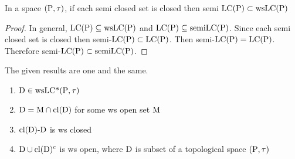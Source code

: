 \begin{thm}\label{thm6.2.24}
In a space $(\mathrm{P}, \tau)$, if each semi closed set is closed then semi $\mathrm{LC}(\mathrm{P}) \subset \mathrm{ws}\mathrm{LC}(\mathrm{P})$
\end{thm}

\begin{proof}
In general, $\mathrm{LC}(\mathrm{P}) \subseteq \mathrm{ws}\mathrm{LC}(\mathrm{P})$ and $\mathrm{LC}(\mathrm{P}) \subseteq \mathrm{semi}\mathrm{LC}(\mathrm{P})$. Since each semi closed set is closed then semi-$\mathrm{LC}(\mathrm{P}) \subset \mathrm{LC}(\mathrm{P})$. Then semi-$\mathrm{LC}(\mathrm{P}) = \mathrm{LC}(\mathrm{P})$. Therefore semi-$\mathrm{LC}(\mathrm{P}) \subset \mathrm{semi}\mathrm{LC}(\mathrm{P})$.
\end{proof}

\begin{thm}\label{thm6.2.25}
The given results are one and the same.
\begin{enumerate}[(1)]
\item $\mathrm{D} \in\mathrm{ws}\mathrm{LC}\text{*}(\mathrm{P}, \tau)$
\item $\mathrm{D} = \mathrm{M} \cap \mathrm{cl}(\mathrm{D})$ for some ws open set $\mathrm{M}$
\item $\mathrm{cl}(\mathrm{D})\text{-}\mathrm{D}$ is ws closed
\item $\mathrm{D} \cup \mathrm{cl}(\mathrm{D})^{\text{c}}$ is ws open, where $\mathrm{D}$ is subset of a topological space $(\mathrm{P}, \tau)$
\end{enumerate}
\end{thm}

\newpage

